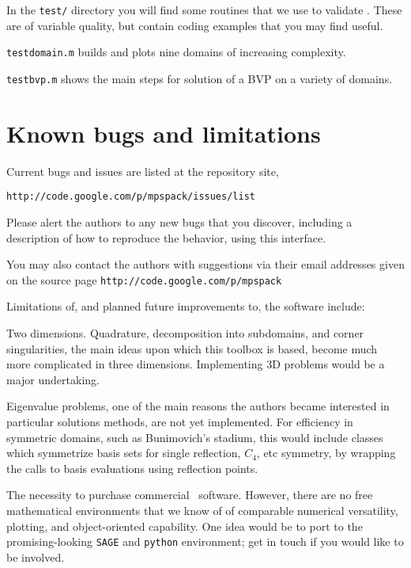 \documentclass[12pt]{article}
\begin{document}
In the {\tt test/} directory you will find some routines that
we use to validate \mpspack. These are of variable quality,
but contain coding examples that you may find useful.
\bi
\item {\tt testdomain.m} builds and plots nine domains of increasing
complexity.
\item {\tt testbvp.m} shows the main steps for solution of a BVP on
a variety of domains.
\item
\ei


\section{Known bugs and limitations}

Current bugs and issues are listed at the repository site,

{\tt http://code.google.com/p/mpspack/issues/list}

Please alert the authors to any new
bugs that you discover, including a description
of how to reproduce the behavior, using this interface.

You may also contact the authors with suggestions
via their email addresses
given on the source page {\tt http://code.google.com/p/mpspack}

Limitations of, and planned future improvements to, the software include:

\bi
\item Two dimensions. Quadrature, decomposition into subdomains, and
corner singularities, the
main ideas upon which this toolbox is based, become much more complicated
in three dimensions. 
Implementing 3D problems would be a major undertaking.

\item Eigenvalue problems, one of the main reasons the authors became
interested in particular solutions methods, are not yet implemented.
For efficiency in symmetric domains, such as Bunimovich's stadium,
this would include
classes which symmetrize basis sets for single reflection, $C_4$, etc
symmetry, by wrapping the calls to basis evaluations using reflection
points.

\item The necessity to purchase commercial \matlab\ software.
However, there are no free mathematical environments that we know of
of comparable numerical versatility, plotting, and object-oriented capability.
One idea would be to port to the promising-looking {\tt SAGE} and {\tt python}
environment; get in touch if you would like to be involved.
\end{document}
